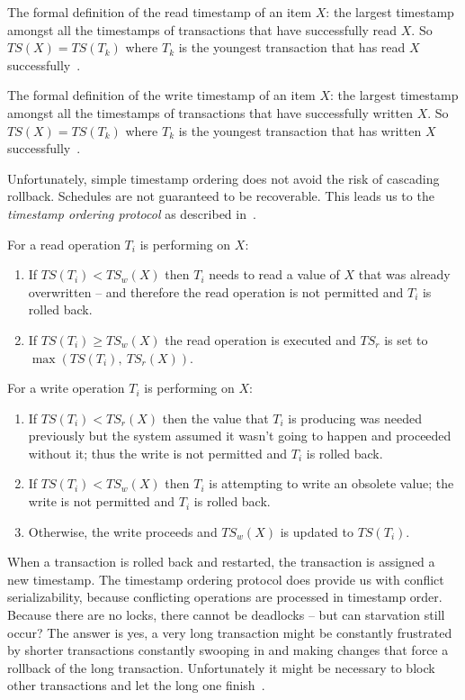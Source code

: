 \documentclass[a4paper]{report}
\begin{document}
The formal definition of the read timestamp of an item $X$: the largest timestamp amongst all the timestamps of transactions that have successfully read $X$. So $T\!S(X) = T\!S(T_{k})$ where $T_{k}$ is the youngest transaction that has read $X$ successfully~\cite{fds}.

The formal definition of the write timestamp of an item $X$: the largest timestamp amongst all the timestamps of transactions that have successfully written $X$. So $T\!S(X) = T\!S(T_{k})$ where $T_{k}$ is the youngest transaction that has written $X$ successfully~\cite{fds}.

Unfortunately, simple timestamp ordering does not avoid the risk of cascading rollback. Schedules are not guaranteed to be recoverable. This leads us to the \textit{timestamp ordering protocol} as described in~\cite{dsc}.

For a read operation $T_{i}$ is performing on $X$:
\begin{enumerate}
	\item If $T\!S(T_{i}) < T\!S_{w}(X)$ then $T_{i}$ needs to read a value of $X$ that was already overwritten -- and therefore the read operation is not permitted and $T_{i}$ is rolled back.
	\item If $T\!S(T_{i}) \geq T\!S_{w}(X)$ the read operation is executed and $T\!S_{r}$ is set to $\max ( T\!S(T_{i}),~T\!S_{r}(X))$.
\end{enumerate}

For a write operation $T_{i}$ is performing on $X$:
\begin{enumerate}

\item If $T\!S(T_{i}) < T\!S_{r}(X)$ then the value that $T_{i}$ is producing was needed previously but the system assumed it wasn't going to happen and proceeded without it; thus the write is not permitted and $T_{i}$ is rolled back.
\item If $T\!S(T_{i}) < T\!S_{w}(X)$ then $T_{i}$ is attempting to write an obsolete value; the write is not permitted and $T_{i}$ is rolled back.
\item Otherwise, the write proceeds and $T\!S_{w}(X)$ is updated to $T\!S(T_{i})$. 

\end{enumerate}

When a transaction is rolled back and restarted, the transaction is assigned a new timestamp. The timestamp ordering protocol does provide us with conflict serializability, because conflicting operations are processed in timestamp order. Because there are no locks, there cannot be deadlocks -- but can starvation still occur? The answer is yes, a very long transaction might be constantly frustrated by shorter transactions constantly swooping in and making changes that force a rollback of the long transaction. Unfortunately it might be necessary to block other transactions and let the long one finish~\cite{dsc}.
\end{document}
